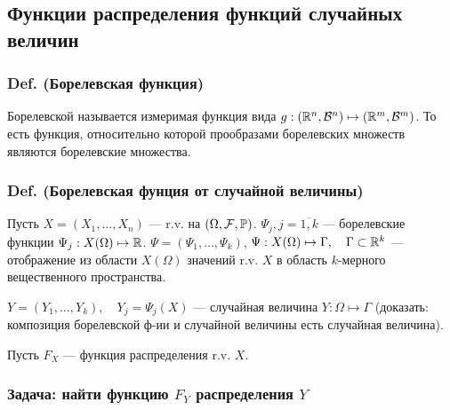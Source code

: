 \subsection{Функции распределения функций случайных
величин}\label{ux444ux443ux43dux43aux446ux438ux438-ux440ux430ux441ux43fux440ux435ux434ux435ux43bux435ux43dux438ux44f-ux444ux443ux43dux43aux446ux438ux439-ux441ux43bux443ux447ux430ux439ux43dux44bux445-ux432ux435ux43bux438ux447ux438ux43d}

\subsubsection{Def. (Борелевская
функция)}\label{def.-ux431ux43eux440ux435ux43bux435ux432ux441ux43aux430ux44f-ux444ux443ux43dux43aux446ux438ux44f}

Борелевской называется измеримая функция вида
\(g : (\mathbb R^n, \mathcal B^n)\mapsto (\mathbb R^m,\mathcal B^m)\). То есть функция,
относительно которой прообразами борелевских множеств являются
борелевские множества.

\subsubsection{Def. (Борелевская фунция от случайной
величины)}\label{def.-ux431ux43eux440ux435ux43bux435ux432ux441ux43aux430ux44f-ux444ux443ux43dux446ux438ux44f-ux43eux442-ux441ux43bux443ux447ux430ux439ux43dux43eux439-ux432ux435ux43bux438ux447ux438ux43dux44b}

Пусть \(X = (X_1, \ldots, X_n)\) --- r.v. на \((\Omega, \mathcal F, \mathbb P)\).
\({\Psi_j, j=\overline{1,k}}\) --- борелевские функции
\({\Psi_j : X(\Omega)\mapsto\mathbb R}\).
\({\Psi = (\Psi_1, \ldots, \Psi_k)}\),
\({\Psi : X(\Omega)\mapsto\Gamma, \quad \Gamma\subset\mathbb R^k}\) ---
отображение из области \(X(\Omega)\) значений r.v. \(X\) в область
\(k\)-мерного вещественного пространства.

\(Y = (Y_1, \ldots, Y_k), \quad Y_j = \Psi_j(X)\) --- случайная величина
\(Y: \Omega\mapsto\Gamma\) (доказать: композиция борелевской ф-ии и
случайной величины есть случайная величина).

Пусть \(F_X\) --- функция распределения r.v. \(X\).

\subsubsection{\texorpdfstring{Задача: найти функцию \(F_Y\)
распределения
\(Y\)}{Задача: найти функцию F\_Y распределения Y}}\label{ux437ux430ux434ux430ux447ux430-ux43dux430ux439ux442ux438-ux444ux443ux43dux43aux446ux438ux44e-fux5fy-ux440ux430ux441ux43fux440ux435ux434ux435ux43bux435ux43dux438ux44f-y}

